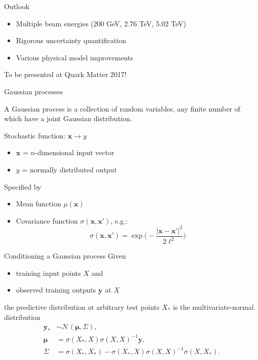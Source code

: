 \documentclass{beamer}
\newcommand{\x}{\mathbf x}
\newcommand{\y}{\mathbf y}
\begin{document}
\begin{frame}{Outlook}
  \begin{itemize}
    \setlength\itemsep{1ex}
    \item Multiple beam energies (200 GeV, 2.76 TeV, 5.02 TeV)
    \item Rigorous uncertainty quantification
    \item Various physical model improvements
  \end{itemize}
  \medskip
  \begin{center}
    To be presented at Quark Matter 2017!
  \end{center}
\end{frame}


\appendix


\begin{frame}{Gaussian processes}
  \begin{definition}
    A Gaussian process is a collection of random variables, any finite number of which have a joint Gaussian distribution.
  \end{definition}
  \medskip
  Stochastic function: $\x \rightarrow y$ \\
  \begin{itemize}
    \item $\x$ = $n$-dimensional input vector
    \item $y$ = normally distributed output
  \end{itemize}
  Specified by
  \begin{itemize}
    \item Mean function $\mu(\x)$
    \item Covariance function $\sigma(\x, \x')$, e.g.:
      \begin{equation*}
        \sigma(\x, \x') = \exp\biggl( -\frac{|\x - \x'|^2}{2\ell^2} \biggr)
      \end{equation*}
  \end{itemize}
\end{frame}

\begin{frame}{Conditioning a Gaussian process}
  Given
  \begin{itemize}
    \item training input points $X$ and
    \item observed training outputs $\y$ at $X$
  \end{itemize}
  the predictive distribution at arbitrary test points $X_*$ is the multivariate-normal distribution
  \begin{align*}
    \y_* &\sim \mathcal N(\boldsymbol\mu, \Sigma), \\
    \boldsymbol\mu &= \sigma(X_*, X)\sigma(X, X)^{-1}\y, \\
    \Sigma &= \sigma(X_*,X_*) - \sigma(X_*,X)\sigma(X,X)^{-1}\sigma(X,X_*).
  \end{align*}
\end{frame}
\end{document}
